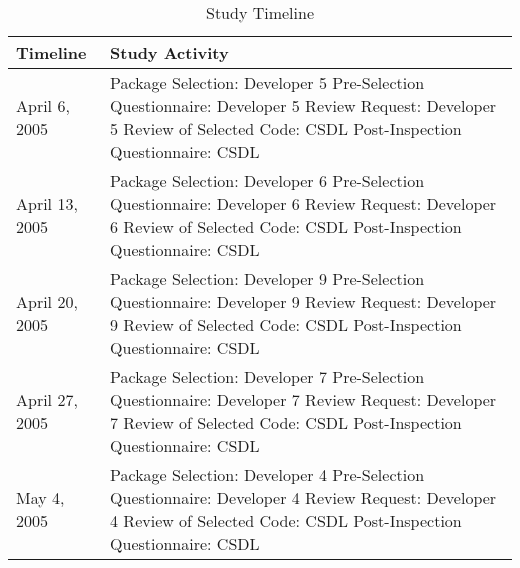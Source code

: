 \begin{table}[htbp]
  \begin{center}
    \caption{Study Timeline}
    \label{tab:eval-timeline}
    \begin{tabular}{|p{5.0cm}|p{8.0cm}|} \hline
      {\bf Timeline} & {\bf Study Activity} \\ \hline
April 6, 2005 & Package Selection: Developer 5 \newline
Pre-Selection Questionnaire: Developer 5 \newline
Review Request: Developer 5 \newline
Review of Selected Code: CSDL \newline
Post-Inspection Questionnaire: CSDL \\ \hline

April 13, 2005 & Package Selection: Developer 6 \newline
Pre-Selection Questionnaire: Developer 6 \newline
Review Request: Developer 6 \newline
Review of Selected Code: CSDL \newline
Post-Inspection Questionnaire: CSDL \\ \hline

April 20, 2005 & Package Selection: Developer 9 \newline
Pre-Selection Questionnaire: Developer 9 \newline
Review Request: Developer 9 \newline
Review of Selected Code: CSDL \newline
Post-Inspection Questionnaire: CSDL \\ \hline

April 27, 2005 & Package Selection: Developer 7 \newline
Pre-Selection Questionnaire: Developer 7 \newline
Review Request: Developer 7 \newline
Review of Selected Code: CSDL \newline
Post-Inspection Questionnaire: CSDL \\ \hline

May 4, 2005 & Package Selection: Developer 4 \newline
Pre-Selection Questionnaire: Developer 4 \newline
Review Request: Developer 4 \newline
Review of Selected Code: CSDL \newline
Post-Inspection Questionnaire: CSDL \\ \hline


\end{tabular}
\end{center}
\end{table}
